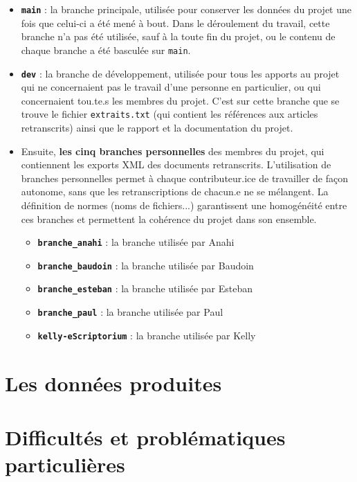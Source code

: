 \documentclass{article}
\begin{document}
	\begin{itemize}
		\item \textbf{\texttt{main}} : la branche principale, utilisée pour conserver les données du projet une fois que celui-ci a été mené à bout. Dans le déroulement du travail, cette branche n'a pas été utilisée, sauf à la toute fin du projet, ou le contenu de chaque branche a été basculée sur \texttt{main}.
		\item \textbf{\texttt{dev}} : la branche de développement, utilisée pour tous les apports au projet qui ne concernaient pas le travail d'une personne en particulier, ou qui concernaient tou.te.s les membres du projet. C'est sur cette branche que se trouve le fichier \texttt{extraits.txt} (qui contient les références aux articles retranscrits) ainsi que le rapport et la documentation du projet.
		\item Ensuite, \textbf{les cinq branches personnelles} des membres du projet, qui contiennent les exports XML des documents retranscrits. L'utilisation de branches personnelles permet à chaque contributeur.ice de travailler de façon autonome, sans que les retranscriptions de chacun.e ne se mélangent. La définition de normes (noms de fichiers...) garantissent une homogénéité entre ces branches et permettent la cohérence du projet dans son ensemble.
		\begin{itemize}
			\item \textbf{\texttt{branche\_anahi}} : la branche utilisée par Anahi
			\item \textbf{\texttt{branche\_baudoin}} : la branche utilisée par Baudoin
			\item \textbf{\texttt{branche\_esteban}} : la branche utilisée par Esteban
			\item \textbf{\texttt{branche\_paul}} : la branche utilisée par Paul
			\item \textbf{\texttt{kelly-eScriptorium}} : la branche utilisée par Kelly
		\end{itemize}
	\end{itemize}
	
	
	\section{Les données produites}
	
	
	
	\section{Difficultés et problématiques particulières}
	
\end{document}
